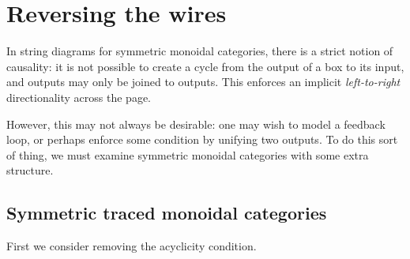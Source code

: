 \section{Reversing the wires}

In string diagrams for symmetric monoidal categories, there is a strict notion
of causality: it is not possible to create a cycle from the output of a box to
its input, and outputs may only be joined to outputs.
This enforces an implicit \emph{left-to-right} directionality across the page.

However, this may not always be desirable: one may wish to model a feedback
loop, or perhaps enforce some condition by unifying two outputs.
To do this sort of thing, we must examine symmetric monoidal categories with
some extra structure.

\subsection{Symmetric traced monoidal categories}

First we consider removing the acyclicity condition.


